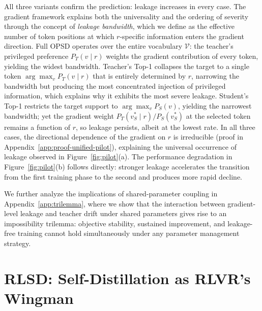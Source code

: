 \documentclass[]{jingdong}
\begin{document}
All three variants confirm the prediction: leakage increases in every case. The gradient framework explains both the universality and the ordering of severity through the concept of \textit{leakage bandwidth}, which we define as the effective number of token positions at which $r$-specific information enters the gradient direction. Full OPSD operates over the entire vocabulary $\mathcal{V}$: the teacher's privileged preference $P_T(v \mid r)$ weights the gradient contribution of every token, yielding the widest bandwidth. Teacher's Top-1 collapses the target to a single token $\arg\max_v P_T(v \mid r)$ that is entirely determined by $r$, narrowing the bandwidth but producing the most concentrated injection of privileged information, which explains why it exhibits the most severe leakage. Student's Top-1 restricts the target support to $\arg\max_v P_S(v)$, yielding the narrowest bandwidth; yet the gradient weight $P_T(v_S^* \mid r)/P_S(v_S^*)$ at the selected token remains a function of $r$, so leakage persists, albeit at the lowest rate. In all three cases, the directional dependence of the gradient on $r$ is irreducible (proof in Appendix~\ref{app:proof-unified-pilot}), explaining the universal occurrence of leakage observed in Figure~\ref{fig:pilot}(a). The performance degradation in Figure~\ref{fig:pilot}(b) follows directly: stronger leakage accelerates the transition from the first training phase to the second and produces more rapid decline.

We further analyze the implications of shared-parameter coupling in Appendix~\ref{app:trilemma}, where we show that the interaction between gradient-level leakage and teacher drift under shared parameters gives rise to an impossibility trilemma: objective stability, sustained improvement, and leakage-free training cannot hold simultaneously under any parameter management strategy.
 



 
\section{RLSD: Self-Distillation as RLVR's Wingman}
\label{sec:method}
 
\end{document}
